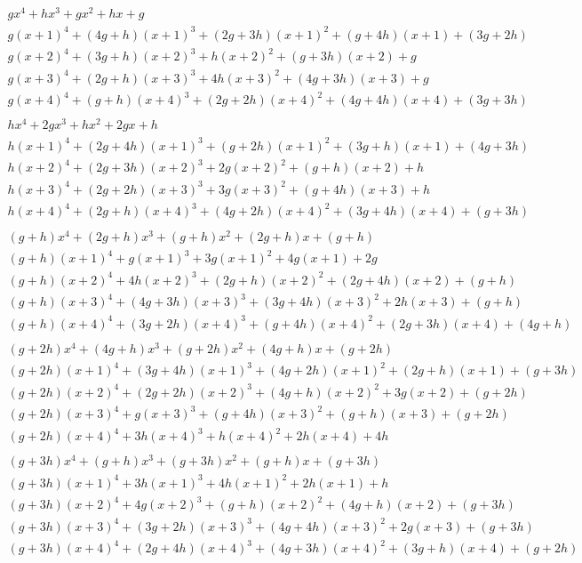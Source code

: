 \documentclass[a4paper, 12pt]{extarticle}
\begin{document}
$$\begin{array}{l}
gx^4 + hx^3 + gx^2 + hx + g \\
g(x+1)^4 + (4g + h)(x+1)^3 + (2g + 3h)(x+1)^2 + (g + 4h)(x+1) + (3g + 2h) \\
g(x+2)^4 + (3g + h)(x+2)^3 + h(x+2)^2 + (g + 3h)(x+2) + g \\
g(x+3)^4 + (2g + h)(x+3)^3 + 4h(x+3)^2 + (4g + 3h)(x+3) + g \\
g(x+4)^4 + (g + h)(x+4)^3 + (2g + 2h)(x+4)^2 + (4g + 4h)(x+4) + (3g + 3h) \\
\end{array}$$
$$\begin{array}{l}
hx^4 + 2gx^3 + hx^2 + 2gx + h \\
h(x+1)^4 + (2g + 4h)(x+1)^3 + (g + 2h)(x+1)^2 + (3g + h)(x+1) + (4g + 3h) \\
h(x+2)^4 + (2g + 3h)(x+2)^3 + 2g(x+2)^2 + (g + h)(x+2) + h \\
h(x+3)^4 + (2g + 2h)(x+3)^3 + 3g(x+3)^2 + (g + 4h)(x+3) + h \\
h(x+4)^4 + (2g + h)(x+4)^3 + (4g + 2h)(x+4)^2 + (3g + 4h)(x+4) + (g + 3h) \\
\end{array}$$
$$\begin{array}{l}
(g + h)x^4 + (2g + h)x^3 + (g + h)x^2 + (2g + h)x + (g + h) \\
(g + h)(x+1)^4 + g(x+1)^3 + 3g(x+1)^2 + 4g(x+1) + 2g \\
(g + h)(x+2)^4 + 4h(x+2)^3 + (2g + h)(x+2)^2 + (2g + 4h)(x+2) + (g + h) \\
(g + h)(x+3)^4 + (4g + 3h)(x+3)^3 + (3g + 4h)(x+3)^2 + 2h(x+3) + (g + h) \\
(g + h)(x+4)^4 + (3g + 2h)(x+4)^3 + (g + 4h)(x+4)^2 + (2g + 3h)(x+4) + (4g + h) \\
\end{array}$$
$$\begin{array}{l}
(g + 2h)x^4 + (4g + h)x^3 + (g + 2h)x^2 + (4g + h)x + (g + 2h) \\
(g + 2h)(x+1)^4 + (3g + 4h)(x+1)^3 + (4g + 2h)(x+1)^2 + (2g + h)(x+1) + (g + 3h) \\
(g + 2h)(x+2)^4 + (2g + 2h)(x+2)^3 + (4g + h)(x+2)^2 + 3g(x+2) + (g + 2h) \\
(g + 2h)(x+3)^4 + g(x+3)^3 + (g + 4h)(x+3)^2 + (g + h)(x+3) + (g + 2h) \\
(g + 2h)(x+4)^4 + 3h(x+4)^3 + h(x+4)^2 + 2h(x+4) + 4h \\
\end{array}$$
$$\begin{array}{l}
(g + 3h)x^4 + (g + h)x^3 + (g + 3h)x^2 + (g + h)x + (g + 3h) \\
(g + 3h)(x+1)^4 + 3h(x+1)^3 + 4h(x+1)^2 + 2h(x+1) + h \\
(g + 3h)(x+2)^4 + 4g(x+2)^3 + (g + h)(x+2)^2 + (4g + h)(x+2) + (g + 3h) \\
(g + 3h)(x+3)^4 + (3g + 2h)(x+3)^3 + (4g + 4h)(x+3)^2 + 2g(x+3) + (g + 3h) \\
(g + 3h)(x+4)^4 + (2g + 4h)(x+4)^3 + (4g + 3h)(x+4)^2 + (3g + h)(x+4) + (g + 2h) \\
\end{array}$$
\end{document}
